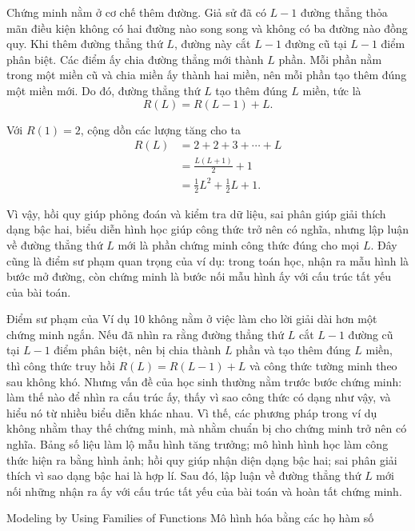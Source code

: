 {    Chứng minh nằm ở cơ chế thêm đường. Giả sử đã có $L-1$ đường thẳng thỏa mãn điều kiện không có hai đường nào song song và không có ba đường nào đồng quy. Khi thêm đường thẳng thứ $L$, đường này cắt $L-1$ đường cũ tại $L-1$ điểm phân biệt. Các điểm ấy chia đường thẳng mới thành $L$ phần. Mỗi phần nằm trong một miền cũ và chia miền ấy thành hai miền, nên mỗi phần tạo thêm đúng một miền mới. Do đó, đường thẳng thứ $L$ tạo thêm đúng $L$ miền, tức là
    $$
      R(L)=R(L-1)+L.
    $$

    Với $R(1)=2$, cộng dồn các lượng tăng cho ta
    \begin{align*}
      R(L)
        &=2+2+3+\cdots+L\\
        &=\frac{L(L+1)}{2}+1\\
        &=\frac{1}{2}L^2+\frac{1}{2}L+1.
    \end{align*}

    Vì vậy, hồi quy giúp phỏng đoán và kiểm tra dữ liệu, sai phân giúp giải thích dạng bậc hai, biểu diễn hình học giúp công thức trở nên có nghĩa, nhưng lập luận về đường thẳng thứ $L$ mới là phần chứng minh công thức đúng cho mọi $L$. Đây cũng là điểm sư phạm quan trọng của ví dụ: trong toán học, nhận ra mẫu hình là bước mở đường, còn chứng minh là bước nối mẫu hình ấy với cấu trúc tất yếu của bài toán.

    Điểm sư phạm của Ví dụ 10 không nằm ở việc làm cho lời giải dài hơn một chứng minh ngắn. Nếu đã nhìn ra rằng đường thẳng thứ $L$ cắt $L-1$ đường cũ tại $L-1$ điểm phân biệt, nên bị chia thành $L$ phần và tạo thêm đúng $L$ miền, thì công thức truy hồi $R(L)=R(L-1)+L$ và công thức tường minh theo sau không khó. Nhưng vấn đề của học sinh thường nằm trước bước chứng minh: làm thế nào để nhìn ra cấu trúc ấy, thấy vì sao công thức có dạng như vậy, và hiểu nó từ nhiều biểu diễn khác nhau. Vì thế, các phương pháp trong ví dụ không nhằm thay thế chứng minh, mà nhằm chuẩn bị cho chứng minh trở nên có nghĩa. Bảng số liệu làm lộ mẫu hình tăng trưởng; mô hình hình học làm công thức hiện ra bằng hình ảnh; hồi quy giúp nhận diện dạng bậc hai; sai phân giải thích vì sao dạng bậc hai là hợp lí. Sau đó, lập luận về đường thẳng thứ $L$ mới nối những nhận ra ấy với cấu trúc tất yếu của bài toán và hoàn tất chứng minh.
  }

\ParallelSection
  {Modeling by Using Families of Functions}
  {Mô hình hóa bằng các họ hàm số}
  {}

